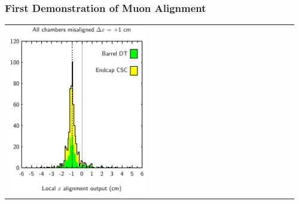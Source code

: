 \documentclass[compress]{beamer}
\begin{document}
\begin{frame}
\frametitle{First Demonstration of Muon Alignment}
\begin{tabular}{p{0.48\linewidth} p{0.48\linewidth}}
  \begin{minipage}{\linewidth}
    \includegraphics[width=\linewidth]{x_alignments_x_aspectratio}
  \end{minipage} &
  \begin{minipage}{\linewidth}

\end{minipage}
\end{tabular}
\end{frame}
\end{document}
